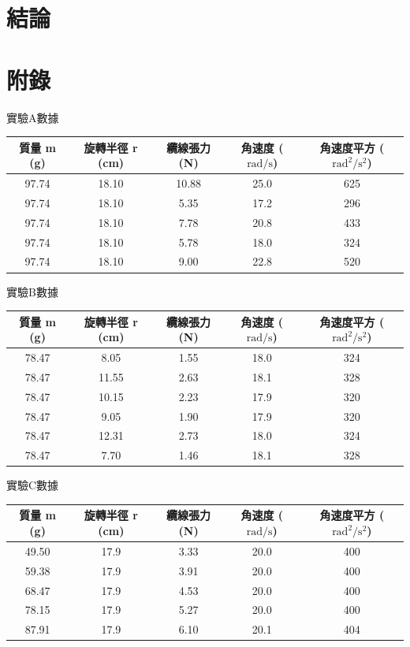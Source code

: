 \documentclass[11pt,a4paper]{article}
\theoremstyle{definition}
\begin{document}
    \section{結論}


    \printbibliography
    \section{附錄}
    \begin{center}
        \quad \quad 實驗A數據
    \end{center}
    \begin{tabular}{|c|c|c|c|c|}
    \hline
        質量 m (g) & 旋轉半徑 r (cm) & 纜線張力 (N) & 角速度 ($\text{rad/s}$) & 角速度平方 ($\text{rad}^2/\text{s}^2$) \\ \hline
        97.74 & 18.10 & 10.88 & 25.0 & 625 \\
        97.74 & 18.10 & 5.35  & 17.2 & 296 \\
        97.74 & 18.10 & 7.78  & 20.8 & 433 \\
        97.74 & 18.10 & 5.78  & 18.0 & 324 \\
        97.74 & 18.10 & 9.00  & 22.8 & 520 \\ \hline
    \end{tabular}
    \begin{center}
        \quad \quad 實驗B數據
    \end{center}
    \begin{tabular}{|c|c|c|c|c|}
    \hline
        質量 m (g) & 旋轉半徑 r (cm) & 纜線張力 (N) & 角速度 ($\text{rad/s}$) & 角速度平方 ($\text{rad}^2/\text{s}^2$) \\ \hline
        78.47 & 8.05 & 1.55 & 18.0 & 324 \\
        78.47 & 11.55 & 2.63 & 18.1 & 328 \\
        78.47 & 10.15 & 2.23 & 17.9 & 320 \\
        78.47 & 9.05 & 1.90 & 17.9 & 320 \\
        78.47 & 12.31 & 2.73 & 18.0 & 324 \\
        78.47 & 7.70 & 1.46 & 18.1 & 328 \\ \hline
    \end{tabular}
        
    \begin{center}
        \quad \quad 實驗C數據
    \end{center}
    \begin{tabular}{|c|c|c|c|c|}
    \hline
        質量 m (g) & 旋轉半徑 r (cm) & 纜線張力 (N) & 角速度 ($\text{rad/s}$) & 角速度平方 ($\text{rad}^2/\text{s}^2$) \\ \hline
        49.50 & 17.9 & 3.33 & 20.0 & 400 \\
        59.38 & 17.9 & 3.91 & 20.0 & 400 \\
        68.47 & 17.9 & 4.53 & 20.0 & 400 \\
        78.15 & 17.9 & 5.27 & 20.0 & 400 \\
        87.91 & 17.9 & 6.10 & 20.1 & 404 \\ \hline
    \end{tabular}
    \par
\end{document}
